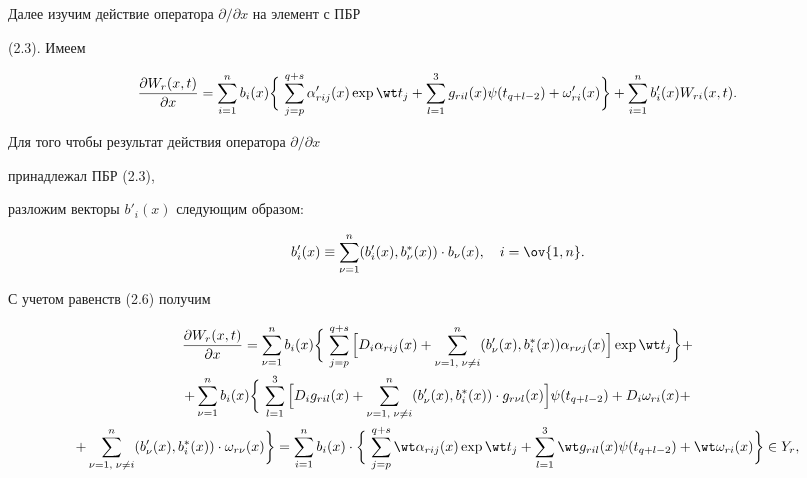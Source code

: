 Далее изучим действие оператора $\partial/\partial x$ на элемент с ПБР 


(2.3). Имеем 


$$ 


\frac{\partial W_r(x,t)}{\partial x}=


\sum^n_{i=1}b_i(x)\bigg\{\,\sum^{q+s}_{j=p} 


\alpha'_{rij}(x)\exp\wt t_j+ 


\sum^3_{l=1}g_{ril}(x)\psi(t_{q+l-2})+\omega'_{ri}(x)\bigg\}+ 


\sum^n_{i=1}b'_i(x)W_{ri}(x,t). 


$$ 


Для того чтобы результат действия оператора $\partial/\partial x$ 


принадлежал ПБР (2.3), 


разложим векторы $b'_i(x)$ следующим образом: 


\begin{equation} 


b'_i(x)\equiv\sum^n_{\nu=1}(b'_i(x),b^*_\nu(x))\cdot b_\nu(x),\quad 


i=\ov{1,n}. 


\end{equation} 


 


С учетом равенств (2.6) получим


\begin{multline} 


\frac{\partial W_r(x,t)}{\partial x}=\sum^n_{\nu=1}b_i(x) 


\bigg\{\,\sum^{q+s}_{j=p}\Big[D_i\alpha_{rij}(x)+ 


\sum^n_{\nu=1,\;\nu\ne i}(b'_\nu(x),b^*_i(x)) 


\alpha_{r\nu j}(x)\Big]\exp\wt t_j\bigg\}+ \\ 


% 


+\sum^n_{\nu=1}b_i(x)\bigg\{\,\sum^3_{l=1}\Big[D_i g_{ril}(x)+ 


\sum^n_{\nu=1,\;\nu\ne i}(b'_\nu(x),b^*_i(x)) \cdot


g_{r\nu l}(x)\Big]\psi(t_{q+l-2})+D_i\omega_{ri}(x)+ \\


%


+\sum^n_{\nu=1,\;\nu\ne i}(b'_\nu(x),b^*_i(x))\cdot\omega_{r\nu}(x) 


\bigg\}=


\sum^n_{i=1}b_i(x)\cdot\bigg\{\,\sum^{q+s}_{j=p}\wt\alpha_{rij}(x) 


\exp\wt t_j+\sum^3_{l=1}\wt g_{ril}(x)\psi(t_{q+l-2}) 


+\wt\omega_{ri}(x)\bigg\}\in Y_r, 


\end{multline} 


